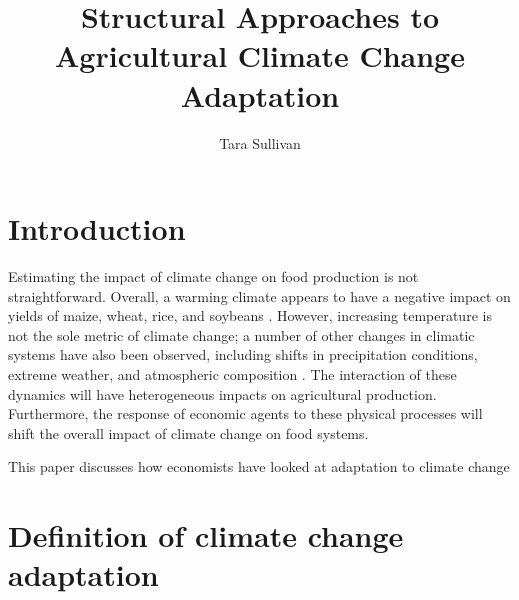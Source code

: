\documentclass[10 pt]{article}
\begin{document}
\title{Structural Approaches to Agricultural Climate Change Adaptation}
\author{Tara Sullivan}

\maketitle
\onehalfspacing

\noindent{}

\section{Introduction}

\begin{outline}

\item Estimating the impact of climate change on food production is not straightforward.
Overall, a warming climate appears to have a negative impact on yields of maize, wheat, rice, and soybeans \parencite{IPCC5WG2C7}.
However, increasing temperature is not the sole metric of climate change; a number of other changes in climatic systems have also been observed, including shifts in precipitation conditions, extreme weather, and atmospheric composition \parencite{IPCC5WG1}. 
The interaction of these dynamics will have heterogeneous impacts on agricultural production. 
Furthermore, the response of economic agents to these physical processes will shift the overall impact of climate change on food systems.

\item This paper discusses how economists have looked at adaptation to climate change 


\end{outline}

\section{Definition of climate change adaptation}
\end{document}
